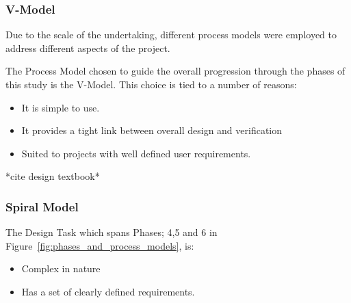 \subsubsection{V-Model}
Due to the scale of the undertaking, different process models were employed to
address different aspects of the project.

The Process Model chosen to guide the overall progression through the phases of
this study is the V-Model. This choice is tied to a number of reasons: 
\begin{itemize}
    \item It is simple to use.
    \item It provides a tight link between overall design and verification 
    \item Suited to projects with well defined user requirements.
\end{itemize}

*cite design textbook*

\subsubsection{Spiral Model}
The Design Task which spans Phases; 4,5 and 6 in Figure~\ref{fig:phases_and_process_models}, is: 
\begin{itemize}
    \item Complex in nature
    \item Has a set of clearly defined requirements. 
\end{itemize}




